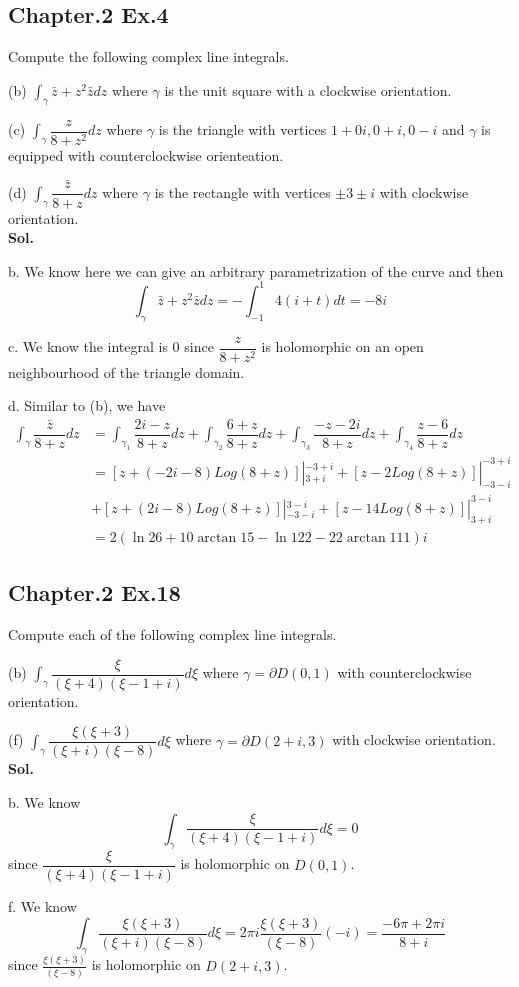 \documentclass[lang=en,11pt,a4paper,citestyle =authoryear]{elegantpaper}
\begin{document}
\subsection*{Chapter.2 Ex.4} 
Compute the following complex line integrals.\par
(b) $\int_{\gamma} \bar{z}+z^2{\bar{z}} dz$ where $\gamma$ is the unit square with a clockwise orientation.\par
(c) $\int_{\gamma} \dfrac{z}{8+z^2}dz$ where $\gamma$ is the triangle with vertices $1+0i,0+i,0-i$ and $\gamma$ is equipped with counterclockwise orienteation.\par
(d) $\int_{\gamma} \dfrac{\bar{z}}{8+z}dz$ where $\gamma$ is the rectangle with vertices $\pm 3\pm i$ with clockwise orientation.
\vspace{0.5em}\\
\textbf{Sol.} \par
b. We know here we can give an arbitrary parametrization of the curve and then
\[\int_{\gamma} \bar{z}+z^2{\bar{z}} dz = -\int_{-1}^1 4(i+t) dt = -8i \]\par
c. We know the integral is $0$ since $\dfrac{z}{8+z^2}$ is holomorphic on an open neighbourhood of the triangle domain.\par
d. Similar to (b), we have
\[
\begin{aligned}
\int_{\gamma} \dfrac{\bar{z}}{8+z} dz &= \int_{\gamma_1} \dfrac{2i-z}{8+z} dz + \int_{\gamma_2} \dfrac{6+z}{8+z} dz + \int_{\gamma_3} \dfrac{-z-2i}{8+z} dz + \int_{\gamma_4} \dfrac{z-6}{8+z} dz \\
&= [z+(-2i-8)Log(8+z)]|_{3+i}^{-3+i} + [z-2Log(8+z)]|_{-3-i}^{-3+i} \\ &+ [z+(2i-8)Log(8+z)]|_{-3-i}^{3-i} + [z-14Log(8+z)]|_{3+i}^{3-i} \\ &= 2(\ln 26+10\arctan15-\ln 122-22\arctan 111)i
\end{aligned}
\]

\vspace{0.5em}

\subsection*{Chapter.2 Ex.18} 
Compute each of the following complex line integrals.\par
(b) $\int_{\gamma} \dfrac{\xi}{(\xi+4)(\xi-1+i)} d\xi$ where $\gamma = \partial D(0,1)$ with counterclockwise orientation.\par
(f) $\int_{\gamma} \dfrac{\xi(\xi+3)}{(\xi+i)(\xi-8)}d\xi$ where $\gamma = \partial D(2+i,3)$ with clockwise orientation.
\vspace{0.5em}\\
\textbf{Sol.} \par
b. We know
\[\int_{\gamma} \dfrac{\xi}{(\xi+4)(\xi-1+i)} d\xi = 0\] since $\dfrac{\xi}{(\xi+4)(\xi-1+i)}$ is holomorphic on $D(0,1)$.\par
f. We know
\[\int_{\gamma} \dfrac{\xi(\xi+3)}{(\xi+i)(\xi-8)}d\xi = 2\pi i \dfrac{\xi(\xi+3)}{(\xi-8)}(-i) = \dfrac{-6\pi + 2\pi i}{8+i} \]
since $\tfrac{\xi(\xi+3)}{(\xi-8)}$ is holomorphic on $D(2+i,3)$.\par
\vspace{0.5em}
\end{document}
